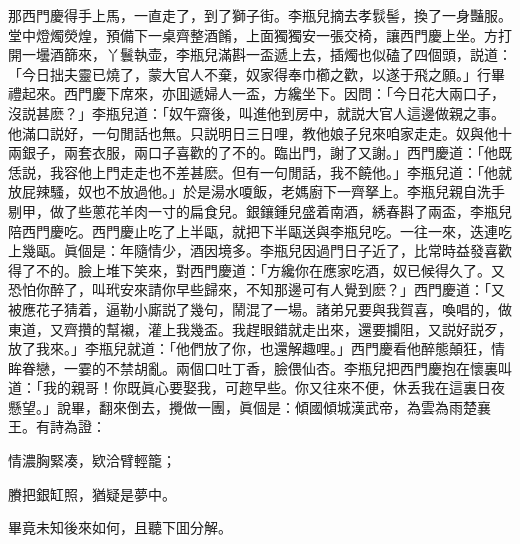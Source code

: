 那西門慶得手上馬，一直走了，到了獅子街。李瓶兒摘去孝䯼髻，換了一身豔服。堂中燈燭熒煌，預備下一桌齊整酒餚，上面獨獨安一張交椅，讓西門慶上坐。方打開一壜酒篩來，丫鬟執壶，李瓶兒滿斟一盃遞上去，插燭也似磕了四個頭，説道：「今日拙夫靈已燒了，蒙大官人不棄，奴家得奉巾櫛之歡，以遂于飛之願。」行畢禮起來。西門慶下席來，亦囬遞婦人一盃，方纔坐下。因問：「今日花大兩口子，沒説甚麽？」李瓶兒道：「奴午齋後，叫進他到房中，就説大官人這邊做親之事。他滿口説好，一句閒話也無。只説明日三日哩，教他娘子兒來咱家走走。奴與他十兩銀子，兩套衣服，兩口子喜歡的了不的。臨出門，謝了又謝。」西門慶道：「他既恁説，我容他上門走走也不差甚麽。但有一句閒話，我不饒他。」李瓶兒道：「他就放屁辣騷，奴也不放過他。」於是湯水嗄飯，老媽廚下一齊拏上。李瓶兒親自洗手剔甲，做了些蔥花羊肉一寸的扁食兒。銀鑲鍾兒盛着南酒，綉春斟了兩盃，李瓶兒陪西門慶吃。西門慶止吃了上半甌，就把下半甌送與李瓶兒吃。一往一來，迭連吃上幾甌。眞個是：年隨情少，酒因境多。李瓶兒因過門日子近了，比常時益發喜歡得了不的。臉上堆下笑來，對西門慶道：「方纔你在應家吃酒，奴已候得久了。又恐怕你醉了，叫玳安來請你早些歸來，不知那邊可有人覺到麽？」西門慶道：「又被應花子猜着，逼勒小廝説了幾句，鬧混了一場。諸弟兄要與我賀喜，喚唱的，做東道，又齊攢的幫襯，灌上我幾盃。我趕眼錯就走出來，還要攔阻，又説好説歹，放了我來。」李瓶兒就道：「他們放了你，也還解趣哩。」西門慶看他醉態顛狂，情眸眷戀，一霎的不禁胡亂。兩個口吐丁香，臉偎仙杏。李瓶兒把西門慶抱在懷裏叫道：「我的親哥！你既眞心要娶我，可趂早些。你又往來不便，休丢我在這裏日夜懸望。」說畢，翻來倒去，攪做一團，眞個是：傾國傾城漢武帝，為雲為雨楚襄王。有詩為證：

\begin{myquote}
情濃胸緊凑，欵洽臂輕籠；

賸把銀缸照，猶疑是夢中。
\end{myquote}

畢竟未知後來如何，且聽下囬分解。

